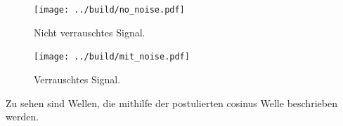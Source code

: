 \begin{figure}[H]
    \texttt{[image: ../build/no\_noise.pdf]}
    \caption{Nicht verrauschtes Signal.}
    \label{fig:fit_no_noise}
\end{figure}

\begin{figure}[H]
    \texttt{[image: ../build/mit\_noise.pdf]}
    \caption{Verrauschtes Signal.}
    \label{fig:fit_mit_noise}
\end{figure}

\noindent
Zu sehen sind Wellen, die mithilfe der postulierten cosinus Welle beschrieben werden. 



